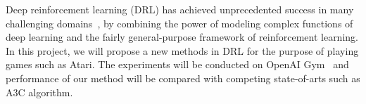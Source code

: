 Deep reinforcement learning (DRL) has achieved
unprecedented success in many challenging
domains~\cite{mnih2015human,silver2016mastering}, by combining the power of modeling complex
functions of deep learning and the fairly general-purpose framework of reinforcement learning.
In this project, we will propose a new methods in DRL for the purpose of playing games such as Atari.
The experiments will be conducted on OpenAI Gym~\cite{brockman2016openai} and performance of our method will be compared with
competing state-of-arts such as A3C algorithm. 